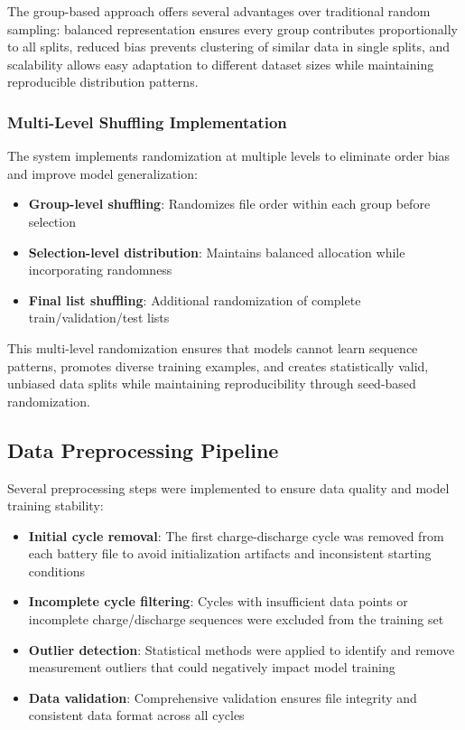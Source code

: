 The group-based approach offers several advantages over traditional random sampling: balanced representation ensures every group contributes proportionally to all splits, reduced bias prevents clustering of similar data in single splits, and scalability allows easy adaptation to different dataset sizes while maintaining reproducible distribution patterns.

\subsubsection{Multi-Level Shuffling Implementation}

The system implements randomization at multiple levels to eliminate order bias and improve model generalization:

\begin{itemize}
    \item \textbf{Group-level shuffling}: Randomizes file order within each group before selection
    \item \textbf{Selection-level distribution}: Maintains balanced allocation while incorporating randomness
    \item \textbf{Final list shuffling}: Additional randomization of complete train/validation/test lists
\end{itemize}

This multi-level randomization ensures that models cannot learn sequence patterns, promotes diverse training examples, and creates statistically valid, unbiased data splits while maintaining reproducibility through seed-based randomization.

\subsection{Data Preprocessing Pipeline}
\label{subsec:preprocessing_pipeline}

Several preprocessing steps were implemented to ensure data quality and model training stability:

\begin{itemize}
    \item \textbf{Initial cycle removal}: The first charge-discharge cycle was removed from each battery file to avoid initialization artifacts and inconsistent starting conditions
    \item \textbf{Incomplete cycle filtering}: Cycles with insufficient data points or incomplete charge/discharge sequences were excluded from the training set
    \item \textbf{Outlier detection}: Statistical methods were applied to identify and remove measurement outliers that could negatively impact model training
    \item \textbf{Data validation}: Comprehensive validation ensures file integrity and consistent data format across all cycles
\end{itemize}

